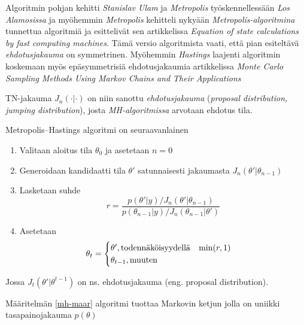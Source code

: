 Algoritmin pohjan kehitti \textit{Stanislav Ulam} ja \textit{Metropolis} työskennellessään \textit{Los Alamosissa} ja myöhemmin \textit{Metropolis} kehitteli nykyään \textit{Metropolis-algoritmina} tunnettua algoritmiä ja esittelivät sen artikkelissa \textit{Equation of state calculations by fast computing machines}\cite{metropolis_nicholas_equation_1953}. Tämä versio algoritmista vaati, että pian esiteltävä \textit{ehdotusjakauma} on symmetrinen. Myöhemmin \textit{Hastings} laajenti algoritmin koskemaan myös epäsymmetrisiä ehdotusjakaumia artikkelissa \textit{Monte Carlo Sampling Methods Using Markov Chains and Their Applications}

\begin{merk}
	TN-jakauma $J_n(\cdot|\cdot)$ on niin sanottu \textit{ehdotusjakauma} (\textit{proposal distribution, jumping distribution}), josta \textit{MH-algoritmissa} arvotaan ehdotus tila.
\end{merk}

\begin{maar}\label{mh-maar}
	Metropolis--Hastings algoritmi on seuraavanlainen
	\begin{enumerate}
		\item Valitaan aloitus tila $\theta_0$ ja asetetaan $n=0$
		\item Generoidaan kandidaatti tila $\theta'$ satunnaisesti jakaumasta $J_n(\theta'|\theta_{n-1})$
		\item Lasketaan suhde
		\begin{displaymath}
			r = \frac{p(\theta'|y)/J_n(\theta'|\theta_{n-1})}{p(\theta_{n-1}|y)/J_n(\theta_{n-1}|\theta')}
		\end{displaymath}
		\item Asetetaan
		\begin{displaymath}
			\theta_t= 
			\begin{cases}
				\theta', \text{todennäköisyydellä} \hspace{0.3cm} \min(r,1) \\
				\theta_{t-1}, \text{muuten}
			\end{cases}
		\end{displaymath}
	\end{enumerate}
	Jossa $J_t(\theta'|\theta^{t-1})$ on ns. ehdotusjakauma (eng. proposal distribution).
\end{maar}

\begin{lause}
	Määritelmän \ref{mh-maar} algoritmi tuottaa Markovin ketjun jolla on uniikki tasapainojakauma $p(\theta)$ 
\end{lause}

